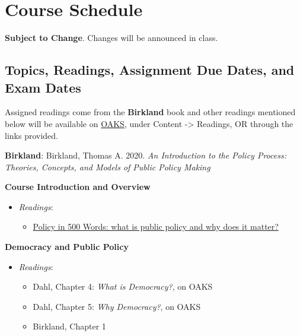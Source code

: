 \hypertarget{course-schedule}{%
\section{Course Schedule}\label{course-schedule}}

\textbf{Subject to Change}. Changes will be announced in class.

\hypertarget{topics-readings-assignment-due-dates-and-exam-dates}{%
\subsection{Topics, Readings, Assignment Due Dates, and Exam
Dates}\label{topics-readings-assignment-due-dates-and-exam-dates}}

Assigned readings come from the \textbf{Birkland} book and other
readings mentioned below will be available on
\href{https://lms.cofc.edu}{OAKS}, under Content -\textgreater{}
Readings, OR through the links provided.

\vspace{0.10in}

\noindent \textbf{Birkland}: Birkland, Thomas A. 2020. \emph{An
Introduction to the Policy Process: Theories, Concepts, and Models of
Public Policy Making}

\SetDate[16/08/2021]

\week \textbf{Course Introduction and Overview}

\begin{itemize}

\item
  \emph{Readings}:

  \begin{itemize}
  
  \item
    \href{https://paulcairney.wordpress.com/2016/04/28/policy-in-500-words-what-is-public-policy-and-why-does-it-matter/}{Policy
    in 500 Words: what is public policy and why does it matter?}
  \end{itemize}
\end{itemize}

\week \textbf{Democracy and Public Policy}

\begin{itemize}

\item
  \emph{Readings}: 

  \begin{itemize}
  
  \item Dahl, Chapter 4: \emph{What is Democracy?}, on OAKS
  \item Dahl, Chapter 5: \emph{Why Democracy?}, on OAKS
  \item Birkland, Chapter 1
  \end{itemize}
\end{itemize}

